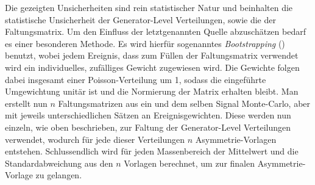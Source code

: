 Die gezeigten Unsicherheiten sind rein statistischer Natur und beinhalten die
statistische Unsicherheit der Generator-Level Verteilungen, sowie die der
Faltungsmatrix. Um den Einfluss der
letztgenannten Quelle abzuschätzen bedarf es einer besonderen Methode. Es
wird hierfür sogenanntes \textit{Bootstrapping} (\cite{zbMATH03631774})
benutzt, wobei jedem Ereignis, dass zum Füllen der Faltungsmatrix verwendet
wird ein individuelles, zufälliges Gewicht zugewiesen wird. Die Gewichte
folgen dabei insgesamt einer Poisson-Verteilung um 1, sodass die eingeführte
Umgewichtung unitär ist und die Normierung der Matrix erhalten bleibt. Man
erstellt nun $n$ Faltungsmatrizen aus ein und dem selben Signal Monte-Carlo,
aber mit jeweils unterschiedlichen Sätzen an Ereignisgewichten.
Diese werden nun einzeln, wie oben beschrieben, zur Faltung der Generator-Level
Verteilungen verwendet, wodurch für jede dieser Verteilungen $n$
Asymmetrie-Vorlagen entstehen. Schlussendlich wird für jeden Massenbereich der
Mittelwert und die Standardabweichung aus den $n$ Vorlagen berechnet, um zur
finalen Asymmetrie-Vorlage zu gelangen.

